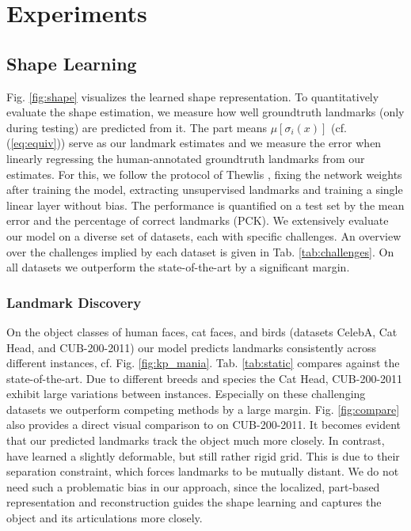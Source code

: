 \chapter{Experiments}

\section{Shape Learning}
	Fig. \ref{fig:shape} visualizes the learned shape representation.
	To quantitatively evaluate the shape estimation, we measure how well groundtruth landmarks (only during testing) are predicted from it.
	The part means $\mu[\sigma_i(x)]$ (cf. (\ref{eq:equiv})) serve as our landmark estimates and we measure the error when linearly regressing the human-annotated groundtruth landmarks from our estimates.
	For this, we follow the protocol of Thewlis \etal \cite{thewlis17}, fixing the network weights after training the model, extracting unsupervised landmarks and training a single linear layer without bias.
	The performance is quantified on a test set by the mean error and the percentage of correct landmarks (PCK).
	We extensively evaluate our model on a diverse set of datasets, each with specific challenges. An overview over the challenges implied by each dataset is given in Tab. \ref{tab:challenges}.
	On all datasets we outperform the state-of-the-art by a significant margin.


	\subsection{Landmark Discovery}
		On the object classes of human faces, cat faces, and birds (datasets CelebA, Cat Head, and CUB-200-2011) our model predicts landmarks consistently across different instances, cf. Fig. \ref{fig:kp_mania}.
		Tab. \ref{tab:static} compares against the state-of-the-art. Due to different breeds and species the Cat Head, CUB-200-2011 exhibit large variations between instances. Especially on these challenging datasets we outperform competing methods by a large margin.
		Fig. \ref{fig:compare} also provides a direct visual comparison to \cite{zhang18} on CUB-200-2011. It becomes evident that our predicted landmarks track the object much more closely. In contrast, \cite{zhang18} have learned a slightly deformable, but still rather rigid grid.
		This is due to their separation constraint, which forces landmarks to be mutually distant. We do not need such a problematic bias in our approach, since the localized, part-based representation and reconstruction guides the shape learning and captures the object and its articulations more closely.
